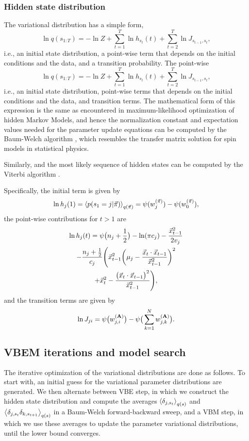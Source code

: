 \subsubsection{Hidden state distribution}
The variational distribution has a simple form,
\begin{equation}\label{seq:qgt}
  \ln q(s_{1:T})=-\ln Z+\sum_{t=1}^T\ln h_{s_t}(t)+\sum_{t=2}^T\ln J_{s_{t-1},s_t},
\end{equation}
i.e., an initial state distribution, a point-wise term that depends on
the initial conditions and the data, and a transition
probability. The point-wise 
\begin{equation}
  \ln q(s_{1:T})=-\ln Z+\sum_{t=1}^T\ln h_{s_t}(t)+\sum_{t=2}^T\ln J_{s_{t-1},s_t},
\end{equation}
i.e., an initial state distribution, point-wise terms that depends on
the initial conditions and the data, and transition terms. The
mathematical form of this expression is the same as encountered in
maximum-likelihood optimization of hidden Markov Models, and hence the
normalization constant and expectation values needed for the parameter
update equations can be computed by the Baum-Welch algorithm
\cite{baum1970}, which resembles the transfer matrix solution for spin
models in statistical physics. 

Similarly, and the most likely sequence of hidden states can be
computed by the Viterbi algorithm \cite{viterbi1967}.

Specifically, the initial term is given by
\begin{equation}
  \ln h_j(1)=
  \left\langle p(s_1=j|\vec{\pi})\right\rangle_{q(\vec{\pi})}
  =\psi(w_{j}^{(\vec{\pi})})-\psi(w_0^{(\vec{\pi})}),
\end{equation}
the point-wise contributions for $t>1$ are
\begin{multline}
  \ln h_j(t)=
  \psi\big(n_j+\frac12\big)-\ln(\pi c_j)-\frac{\vec{x}_{t-1}^2}{2v_j}\\
-\frac{n_j+\frac12}{c_j}\Bigg(
\vec{x}_{t-1}^2\bigg(\mu_j-\frac{\vec{x}_t\cdot\vec{x}_{t-1}}{\vec{x}_{t-1}^2}\bigg)^2\\
+\vec{x}_t^2-\frac{\big(\vec{x}_t\cdot\vec{x}_{t-1}\big)^2}{\vec{x}_{t-1}^2}\Bigg),
\end{multline}
and the transition terms are given by
\begin{equation}
    \ln J_{ji}=\psi\big(w_{j,i}^{(\mathbf{A})}\big)
    -\psi\big(\sum_{k=1}^Nw_{j,k}^{(\mathbf{A})}\big).
\end{equation}
\subsection{VBEM iterations and model search}
The iterative optimization of the variational distributions are done
as follows. To start with, an initial guess for the variational
parameter distributions are generated. We then alternate between VBE
step, in which we construct the hidden state distribution and compute
the averages $\left\langle \delta_{j,s_t}\right\rangle_{q(s)}$ and
$\left\langle \delta_{j,s_t}\delta_{k,s_{t+1}}\right\rangle_{q(s)}$ in a Baum-Welch
forward-backward sweep, and a VBM step, in which we use these averages
to update the parameter variational distributions, until the lower
bound converges.

